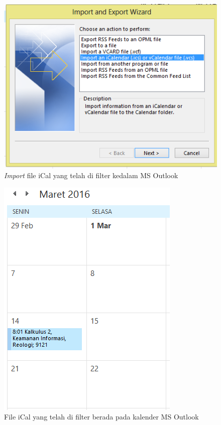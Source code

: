 	
			\begin{figure}[H]
			\centering
			\includegraphics[scale=0.8]{Gambar/importOutlook}
			\caption{\textit{Import} file iCal yang telah di filter kedalam MS Outlook }
			\label{fig:importOutlookFilter}
			\end{figure}
		
			\begin{figure}[H]
			\centering
			\includegraphics[scale=0.8]{Gambar/hasilOutlook2}
			\caption{File iCal yang telah di filter berada pada kalender MS Outlook }
			\label{fig:hasilOutlookFilter2}
			\end{figure}
			
